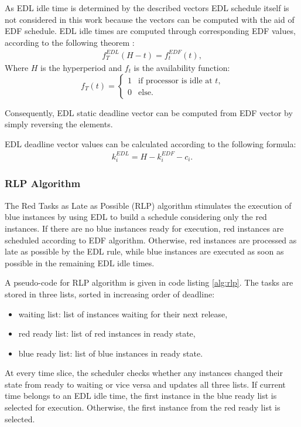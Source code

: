 As EDL idle time is determined by the described vectors EDL schedule itself is not considered in this work because the vectors can be computed with the aid of EDF schedule.
EDL idle times are computed through corresponding EDF values, according to the following theorem \cite{chetto1989some}:
\begin{align}
f_T^{EDL}(H - t) = f_t^{EDF}(t),
\end{align}
Where $H$ is the hyperperiod and $f_t$ is the availability function:
\begin{equation*}
f_T(t) = \begin{cases}
1 &\text{if processor is idle at $t$,}\\
0 &\text{else.}
\end{cases}
\end{equation*}

Consequently, EDL static deadline vector can be computed from EDF vector by simply reversing the elements.

EDL deadline vector values can be calculated according to the following formula:
\begin{align}
k_i^{EDL} = H - k_i^{EDF} - c_i.
\end{align} 

\subsubsection{RLP Algorithm}
The Red Tasks as Late as Possible (RLP) algorithm stimulates the execution of blue instances by using EDL to build a schedule considering only the red instances. 
If there are no blue instances ready for execution, red instances are scheduled according to EDF algorithm.
Otherwise, red instances are processed as late as possible by the EDL rule, while blue instances are executed as soon as possible in the remaining EDL idle times.

A pseudo-code for RLP algorithm is given in code listing \ref{alg:rlp}.
The tasks are stored in three lists, sorted in increasing order of deadline: 
\begin{itemize}
	\item{waiting list: list of instances waiting for their next release,}
	\item{red ready list: list of red instances in ready state,}
	\item{blue ready list: list of blue instances in ready state.}
\end{itemize}
At every time slice, the scheduler checks whether any instances changed their state from ready to waiting or vice versa and updates all three lists.
If current time belongs to an EDL idle time, the first instance in the blue ready list is selected for execution. Otherwise, the first instance from the red ready list is selected.


